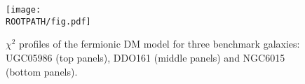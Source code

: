 \begin{figure}%
	\centering%
	\texttt{[image: \\ROOTPATH/fig.pdf]}%
	\caption{$\chi^2$ profiles of the fermionic DM model for three benchmark galaxies: UGC05986 (top panels), DDO161 (middle panels) and NGC6015 (bottom panels).}%
	\label{fig:chi-analysis}%
\end{figure}
